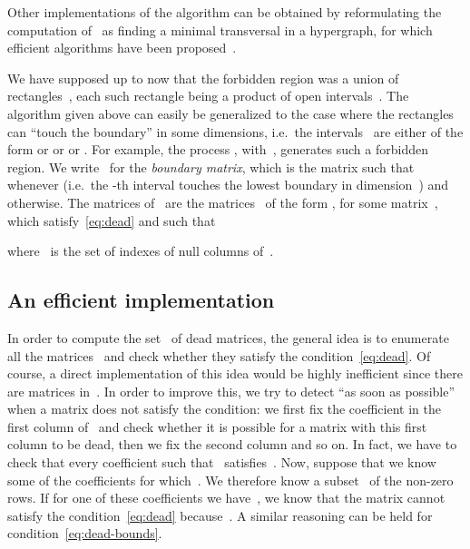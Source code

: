 \documentclass[orivec]{llncs} \usepackage[T1]{fontenc}
\newcommand{\ie}{i.e.~}
\begin{document}
Other implementations of the algorithm can be obtained by reformulating the
computation of~ as finding a minimal transversal in a
hypergraph, 
for which efficient algorithms have been
proposed~\cite{kavvadias1999evaluation}.


We have supposed up to now that the forbidden region was a
union of rectangles~, each such rectangle being a product of open
intervals~. The algorithm given above can easily be
generalized to the case where the rectangles~ can ``touch the boundary'' in
some dimensions, \ie the intervals~ are either of the form
 or  or  or . For example,
the process , with~, generates
such a forbidden region. We write~ for the \emph{boundary
  matrix}, which is the matrix such that  whenever  (\ie the
-th interval touches the lowest boundary in dimension~) and
\hbox{} otherwise. The matrices of~ are the matrices~ of the form \hbox{}, for some matrix~,
which satisfy~\eqref{eq:dead} and such that

where~ is the set of indexes of null columns of~.

\subsection{An efficient implementation}
\label{sec:implem}
In order to compute the set~ of dead matrices, the general idea is to
enumerate all the matrices~ and check whether they satisfy the
condition~\eqref{eq:dead}. Of course, a direct implementation of this idea would
be highly inefficient since there are  matrices in~. In order
to improve this, we try to detect ``as soon as possible'' when a matrix does not
satisfy the condition: we first fix the coefficient in the first column of~
and check whether it is possible for a matrix with this first column to be dead,
then we fix the second column and so on. In fact, we have to check that every
coefficient  such that~ satisfies~. Now,
suppose that we know some of the coefficients  for which~. We
therefore know a subset~ of the non-zero rows. If for one of
these coefficients we have~, we know that the matrix cannot
satisfy the condition~\eqref{eq:dead} because~. A similar reasoning can be held for
condition~\eqref{eq:dead-bounds}.
\end{document}
